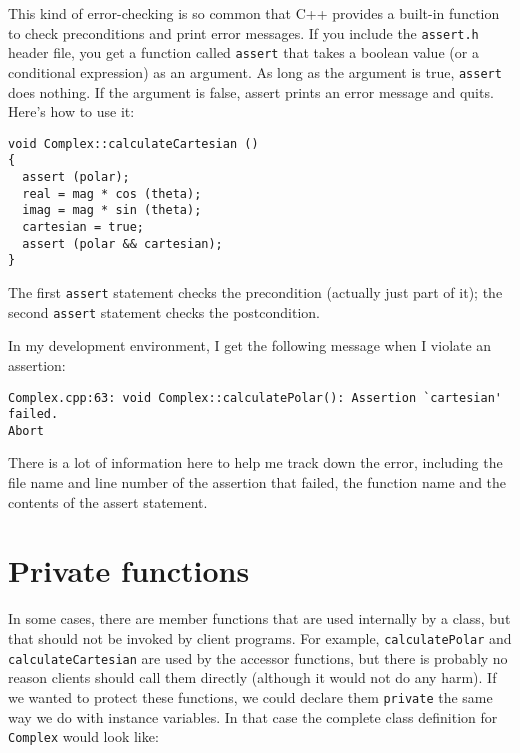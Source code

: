 
This kind of error-checking is so common that C++ provides
a built-in function to check preconditions and print error messages.
If you include the {\tt assert.h} header file, you get a function
called {\tt assert} that takes a boolean value (or a conditional
expression) as an argument.  As long as the argument is true,
{\tt assert} does nothing.  If the argument is false, assert
prints an error message and quits.  Here's how to use it:

\begin{verbatim}
void Complex::calculateCartesian ()
{
  assert (polar);
  real = mag * cos (theta);
  imag = mag * sin (theta);
  cartesian = true;
  assert (polar && cartesian);
}
\end{verbatim}
%
The first {\tt assert} statement checks the precondition
(actually just part of it); the second {\tt assert} statement
checks the postcondition.

In my development environment, I get the following message
when I violate an assertion:

\begin{verbatim}
Complex.cpp:63: void Complex::calculatePolar(): Assertion `cartesian' failed.
Abort
\end{verbatim}
%
There is a lot of information here to help me track down the error,
including the file name and line number of the assertion that
failed, the function name and the contents of the assert statement.


\section{Private functions}

In some cases, there are member functions that are used internally
by a class, but that should not be invoked by client programs.
For example, {\tt calculatePolar} and {\tt calculateCartesian}
are used by the accessor functions, but there is probably no
reason clients should call them directly (although it would not
do any harm).  If we wanted to protect these functions, we
could declare them {\tt private} the same way we do with instance
variables.  In that case the complete class definition for
{\tt Complex} would look like:

